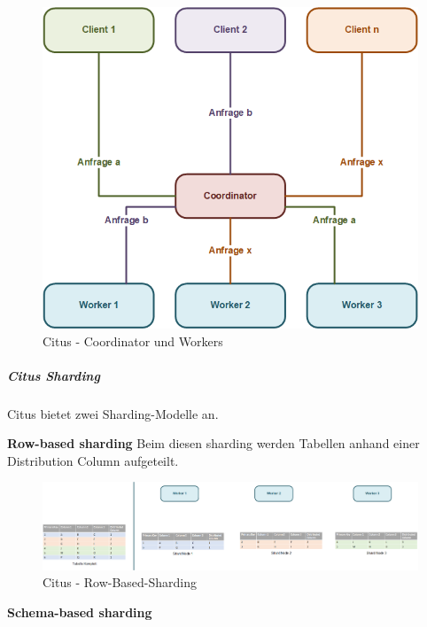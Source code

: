 \begin{flushleft}
\begin{flushleft}
\begin{figure}[H]
            \centering
            \includegraphics[width=0.75\linewidth]{source/implementation/evaluation/postgresql_ha_solutions/stackgres/citus_coordinator_worker}
            \caption{Citus - Coordinator und Workers}
            \label{fig:citus_coordinator_worker}
        \end{figure}
    \end{flushleft}
    \begin{flushleft}
        \subparagraph{Citus Sharding}
        Citus bietet zwei Sharding-Modelle an.
        \begin{flushleft}
            \textbf{Row-based sharding}
            Beim diesen sharding werden Tabellen anhand einer Distribution Column aufgeteilt. \cite{2Y5FA36C, FDUUL9IM}
            \begin{figure}[H]
                \centering
                \includegraphics[width=0.8\linewidth]{source/implementation/evaluation/postgresql_ha_solutions/stackgres/citus_row-based-sharding}
                \caption{Citus - Row-Based-Sharding}
                \label{fig:citus_row-based-sharding}
            \end{figure}
        \end{flushleft}
        \begin{flushleft}
            \textbf{Schema-based sharding}
            \begin{figure}[H]
                \centering

\end{figure}
\end{flushleft}
\end{flushleft}
\end{flushleft}
